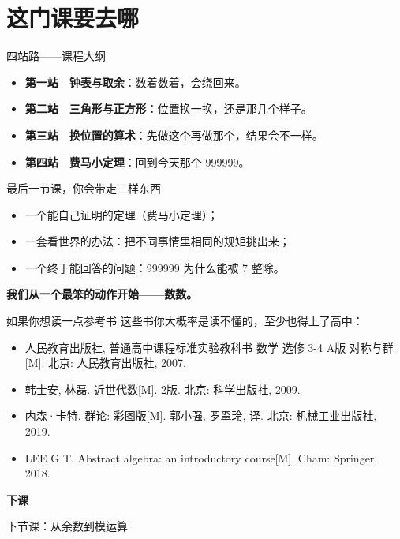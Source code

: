 \documentclass[10pt]{beamer}
\begin{document}
\section{这门课要去哪}

\begin{frame}{四站路——课程大纲}
  \begin{itemize}
    \item \textbf{第一站　钟表与取余}：数着数着，会绕回来。
    \item \textbf{第二站　三角形与正方形}：位置换一换，还是那几个样子。
    \item \textbf{第三站　换位置的算术}：先做这个再做那个，结果会不一样。
    \item \textbf{第四站　费马小定理}：回到今天那个 999999。
  \end{itemize}

\end{frame}

\begin{frame}{最后一节课，你会带走三样东西}
  \begin{itemize}
    \item 一个能自己证明的定理（费马小定理）；
    \item 一套看世界的办法：把不同事情里相同的规矩挑出来；
    \item 一个终于能回答的问题：999999 为什么能被 7 整除。
  \end{itemize}

  \vspace{0.6em}
  \begin{center}
    {\large\textcolor{textgreen}{\bfseries 我们从一个最笨的动作开始——数数。}}
  \end{center}
\end{frame}
\begin{frame}{如果你想读一点参考书}
  这些书你大概率是读不懂的，至少也得上了高中：
  \begin{itemize}
    \item 人民教育出版社, 普通高中课程标准实验教科书 数学 选修 3-4 A版 对称与群[M]. 北京: 人民教育出版社, 2007.
    \item 韩士安, 林磊. 近世代数[M]. 2版. 北京: 科学出版社, 2009.
    \item 内森·卡特. 群论: 彩图版[M]. 郭小强, 罗翠玲, 译. 北京: 机械工业出版社, 2019.
    \item LEE G T. Abstract algebra: an introductory course[M]. Cham: Springer, 2018.
  \end{itemize}
  
\end{frame}
\begin{frame}
  \begin{center}
    \vspace{1.6cm}
    {\Large\textcolor{textgreen}{\bfseries 下课}}

    \vspace{1.0cm}
    {\large\textcolor{accentgreen}{下节课：从余数到模运算}}
  \end{center}
\end{frame}
\end{document}
